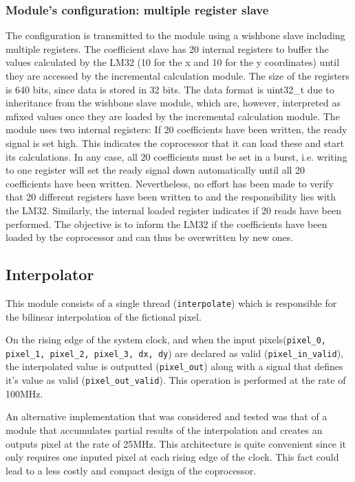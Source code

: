 \subsubsection{Module's configuration: multiple register slave}

The configuration is transmitted to the module using a wishbone slave including multiple registers.
The coefficient slave has 20 internal registers to buffer the values calculated by the LM32 (10 for the x and 10 for the y coordinates) until they are accessed by the incremental calculation module. The size of the registers is 640 bits, since data is stored in 32 bits. The data format is uint32\_t due to inheritance from the wishbone slave module, which are, however, interpreted as mfixed values once they are loaded by the incremental calculation module. The module uses two internal registers: If 20 coefficients have been written, the ready signal is set high. This indicates the coprocessor that it can load these and start its calculations. In any case, all 20 coefficients must be set in a burst, i.e. writing to one register will set the ready signal down automatically until all 20 coefficients have been written. Nevertheless, no effort has been made to verify that 20 different registers have been written to and the responsibility lies with the LM32. Similarly, the internal loaded register indicates if 20 reads have been performed. The objective is to inform the LM32 if the coefficients have been loaded by the coprocessor and can thus be overwritten by new ones.

\subsection{Interpolator}
This module consists of a single thread (\texttt{interpolate}) which is responsible for the bilinear interpolation of the fictional pixel. 

On the rising edge of the system clock, and when the input pixels(\texttt{pixel\_0, pixel\_1, pixel\_2, pixel\_3, dx, dy}) are declared as valid (\texttt{pixel\_in\_valid}), the interpolated value is outputted (\texttt{pixel\_out}) along with a signal that defines it's value as valid (\texttt{pixel\_out\_valid}). 
This operation is performed at the rate of 100MHz.  


An alternative implementation that was considered and tested was that of a module that accumulates partial results of the interpolation and creates an outputs pixel at the rate of 25MHz. This architecture is quite convenient since it only requires one inputed pixel at each rising edge of the clock. This fact could lead to a less costly and compact design of the coprocessor.  

